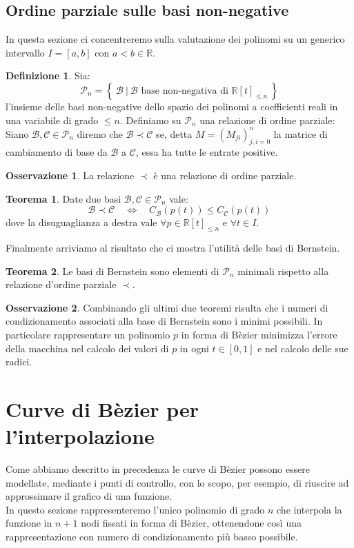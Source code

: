 \documentclass[a4paper,12pt]{report}
\theoremstyle{definition}
\newtheorem{defin}{Definizione}[chapter]
\newtheorem{thrm}{Teorema}[chapter]
\newtheorem{oss}{Osservazione}[chapter]
\newcommand{\numberset}{\mathbb}
\newcommand{\R}{{\numberset{R}}}
\newcommand{\Calb}{{\mathcal{B}}}
\newcommand{\Calc}{{\mathcal{C}}}
\newcommand{\Calp}{{\mathcal{P}}}
\begin{document}
\subsection{Ordine parziale sulle basi non-negative}
In questa sezione ci concentreremo sulla valutazione dei polinomi su un generico intervallo $I = [a,b]$ con $a < b \in \R $.
\begin{defin}
	Sia: $$\Calp_n = \left\{ \ \Calb \ \big| \ \Calb\mbox{ base non-negativa di } \R [t]_{\le n} \ \right\}$$
	l'insieme delle basi non-negative dello spazio dei polinomi a coefficienti reali in una variabile di grado $\le n$. Definiamo su $\Calp_n$ una relazione di ordine parziale:\\
	Siano $\Calb , \Calc \in \Calp_n$ diremo che $\Calb \prec \Calc$ se, detta $M=(M_{ji})_{j,i=0}^n$ la matrice di cambiamento di base da $\Calb$ a $\Calc$, essa ha tutte le entrate positive.
\end{defin}
\begin{oss}
	La relazione $\prec$ è una relazione di ordine parziale.
\end{oss}
\begin{thrm}
	Date due basi $\Calb , \Calc \in \Calp_n$ vale:$$\Calb \prec \Calc \quad \Leftrightarrow \quad C_\Calb(p(t)) \le C_\Calc(p(t))$$
	dove la disuguaglianza a destra vale $\forall p \in \R [t]_{\le n}$ e $ \forall t \in I$. 
\end{thrm}
Finalmente arriviamo al risultato che ci mostra l'utilità delle basi di Bernstein.
\begin{thrm}
	Le basi di Bernstein sono elementi di $\Calp_n$ minimali rispetto alla relazione d'ordine parziale $\prec$. 
\end{thrm}
\begin{oss}
	Combinando gli ultimi due teoremi risulta che i numeri di condizionamento associati alla base di Bernstein sono i minimi possibili. In particolare rappresentare un polinomio $p$ in forma di Bèzier minimizza l'errore della macchina nel calcolo dei valori di $p$ in ogni $t \in [0,1]$ e nel calcolo delle sue radici.
\end{oss}
\section{Curve di Bèzier per l'interpolazione}
Come abbiamo descritto in precedenza le curve di Bèzier possono essere modellate, mediante i punti di controllo, con lo scopo, per esempio, di riuscire ad approssimare il grafico di una funzione.\\
In questo sezione rappresenteremo l'unico polinomio di grado $n$ che interpola la funzione in $n+1$ nodi fissati in forma di Bèzier, ottenendone così una rappresentazione con numero di condizionamento più basso possibile.\\
\end{document}
